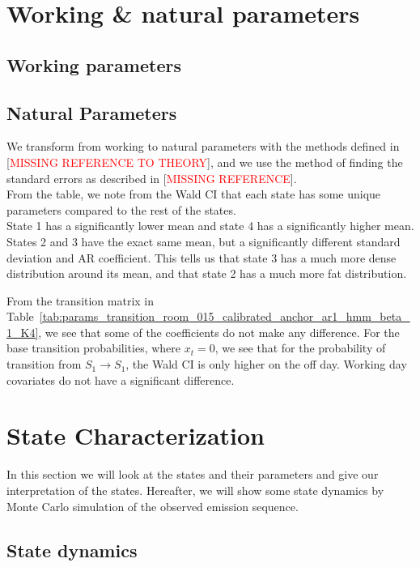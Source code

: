 \section{Working \& natural parameters}
\subsection{Working parameters}


\subsection{Natural Parameters}

We transform from working to natural parameters with the methods defined in [\textcolor{red}{MISSING REFERENCE TO THEORY}],
and we use the method of finding the standard errors as described in [\textcolor{red}{MISSING REFERENCE}]. \\
From the table, we note from the Wald CI that each state has some unique parameters compared to the rest of the states. \\
State 1 has a significantly lower mean and state 4 has a significantly higher mean. States 2 and 3 have the exact same
mean, but a significantly different standard deviation and AR coefficient. This tells us that state 3 has a much more
dense distribution around its mean, and that state 2 has a much more fat distribution.


From the transition matrix in Table~\ref{tab:params_transition_room_015_calibrated_anchor_ar1_hmm_beta_1_K4},
we see that some of the coefficients do not make any difference. For the base transition probabilities, where
$x_t = 0$, we see that for the probability of transition from $S_1 \rightarrow S_1$, the Wald CI is only higher on the off day.
Working day covariates do not have a significant difference.
\section{State Characterization}
In this section we will look at the states and their parameters and give our interpretation of the states. Hereafter, we will
show some state dynamics by Monte Carlo simulation of the observed emission sequence.


\subsection{State dynamics}






